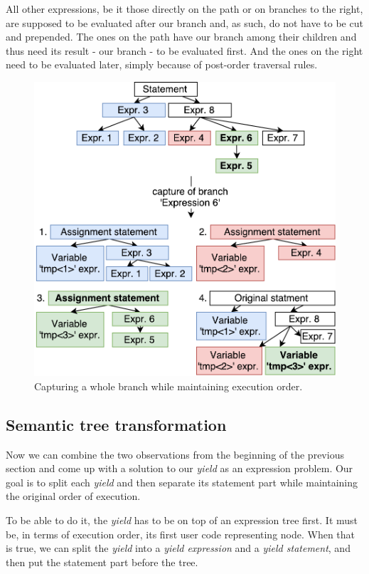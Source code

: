 All other expressions, be it those directly on the path or on branches to the right, are supposed to be evaluated after our branch and, as such, do not have to be cut and prepended. The ones on the path have our branch among their children and thus need its result - our branch - to be evaluated first. And the ones on the right need to be evaluated later, simply because of post-order traversal rules. 

\begin{figure}[h]
	\centering	
	\includegraphics[scale=0.75]{../img/5_2_captureAllOnPath}	
	\caption{Capturing a whole branch while maintaining execution order.}
	\label{fig5.2:CaptureAllBranch}
\end{figure}

\subsection{Semantic tree transformation}

Now we can combine the two observations from the beginning of the previous section and come up with a solution to our \emph{yield} as an expression problem. Our goal is to split each \emph{yield} and then separate its statement part while maintaining the original order of execution.

To be able to do it, the \emph{yield} has to be on top of an expression tree first. It must be, in terms of execution order, its first user code representing node. When that is true, we can split the \emph{yield} into a \emph{yield expression} and a \emph{yield statement}, and then put the statement part before the tree. 

